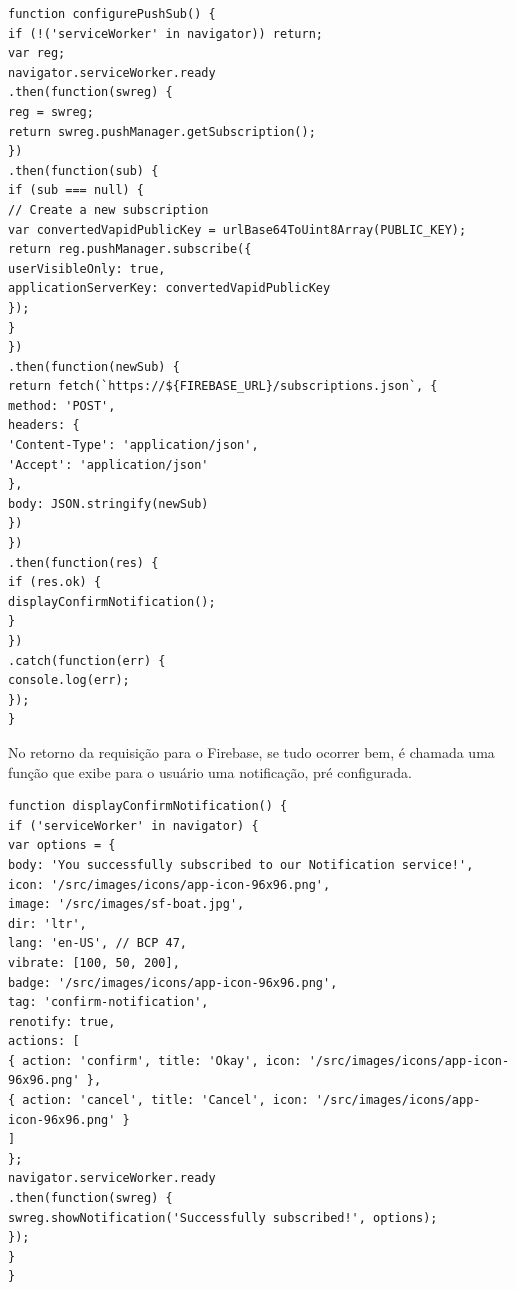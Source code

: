\begin{lstlisting}[frame=single,label=lst:inscricao,caption=Configurando Push Notifications, basicstyle=\footnotesize]
function configurePushSub() {
if (!('serviceWorker' in navigator)) return;
var reg;
navigator.serviceWorker.ready
.then(function(swreg) {
reg = swreg;
return swreg.pushManager.getSubscription();
})
.then(function(sub) {
if (sub === null) {
// Create a new subscription
var convertedVapidPublicKey = urlBase64ToUint8Array(PUBLIC_KEY);
return reg.pushManager.subscribe({
userVisibleOnly: true,
applicationServerKey: convertedVapidPublicKey
});
}
})
.then(function(newSub) {
return fetch(`https://${FIREBASE_URL}/subscriptions.json`, {
method: 'POST',
headers: {
'Content-Type': 'application/json',
'Accept': 'application/json'
},
body: JSON.stringify(newSub)
})
})
.then(function(res) {
if (res.ok) {
displayConfirmNotification();
}
})
.catch(function(err) {
console.log(err);
});
}
\end{lstlisting}
\vspace{-0.75cm}
\begin{center}
\end{center}


\newpage
No retorno da requisição para o Firebase, se tudo ocorrer bem, é chamada uma função que exibe para o usuário uma notificação, pré configurada.
\begin{lstlisting}[frame=single,label=lst:pushNotificacao,caption= Notificação Pré configurada, basicstyle=\footnotesize]
function displayConfirmNotification() {
if ('serviceWorker' in navigator) {
var options = {
body: 'You successfully subscribed to our Notification service!',
icon: '/src/images/icons/app-icon-96x96.png',
image: '/src/images/sf-boat.jpg',
dir: 'ltr',
lang: 'en-US', // BCP 47,
vibrate: [100, 50, 200],
badge: '/src/images/icons/app-icon-96x96.png',
tag: 'confirm-notification',
renotify: true,
actions: [
{ action: 'confirm', title: 'Okay', icon: '/src/images/icons/app-icon-96x96.png' },
{ action: 'cancel', title: 'Cancel', icon: '/src/images/icons/app-icon-96x96.png' }
]
};
navigator.serviceWorker.ready
.then(function(swreg) {
swreg.showNotification('Successfully subscribed!', options);
});
}
}
\end{lstlisting}
\vspace{-0.75cm}
\begin{center}
\end{center}

